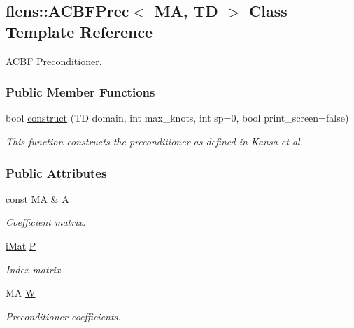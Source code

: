 \hypertarget{classflens_1_1ACBFPrec}{
\subsection{flens::ACBFPrec$<$ MA, TD $>$ Class Template Reference}
\label{classflens_1_1ACBFPrec}
}
ACBF Preconditioner.  


\subsubsection*{Public Member Functions}
\begin{CompactItemize}
\item 
bool \hyperlink{classflens_1_1ACBFPrec_d6f568d64787268a5fb16eed6692f418}{construct} (TD domain, int max\_\-knots, int sp=0, bool print\_\-screen=false)
\begin{CompactList}\small\item\em This function constructs the preconditioner as defined in Kansa et al. \item\end{CompactList}\end{CompactItemize}
\subsubsection*{Public Attributes}
\begin{CompactItemize}
\item 
\hypertarget{classflens_1_1ACBFPrec_b049a1415caf120cd20277b1f88bf1e4}{
const MA \& \hyperlink{classflens_1_1ACBFPrec_b049a1415caf120cd20277b1f88bf1e4}{A}}
\label{classflens_1_1ACBFPrec_b049a1415caf120cd20277b1f88bf1e4}

\begin{CompactList}\small\item\em Coefficient matrix. \item\end{CompactList}\item 
\hypertarget{classflens_1_1ACBFPrec_5875403ec66bd55e6ae0f986d298fdc7}{
\hyperlink{Traits_8hpp_a667f32088e1c93b532a640fe84dc4cd}{iMat} \hyperlink{classflens_1_1ACBFPrec_5875403ec66bd55e6ae0f986d298fdc7}{P}}
\label{classflens_1_1ACBFPrec_5875403ec66bd55e6ae0f986d298fdc7}

\begin{CompactList}\small\item\em Index matrix. \item\end{CompactList}\item 
\hypertarget{classflens_1_1ACBFPrec_c64b96e2976bbf8dbdfd153d53ee96a1}{
MA \hyperlink{classflens_1_1ACBFPrec_c64b96e2976bbf8dbdfd153d53ee96a1}{W}}
\label{classflens_1_1ACBFPrec_c64b96e2976bbf8dbdfd153d53ee96a1}

\begin{CompactList}\small\item\em Preconditioner coefficients. \item\end{CompactList}\end{CompactItemize}


